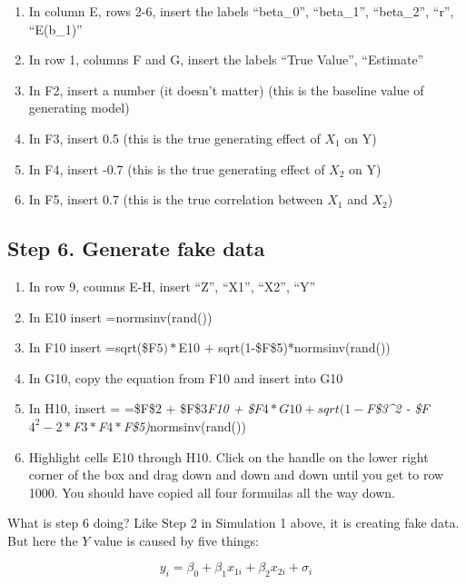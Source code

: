 \documentclass[]{book}
\providecommand{\tightlist}{%
  \setlength{\itemsep}{0pt}\setlength{\parskip}{0pt}}
\begin{document}
\begin{enumerate}
\def\labelenumi{\arabic{enumi}.}
\tightlist
\item
  In column E, rows 2-6, insert the labels ``beta\_0'', ``beta\_1'',
  ``beta\_2'', ``r'', ``E(b\_1)''
\item
  In row 1, columns F and G, insert the labels ``True Value'',
  ``Estimate''
\item
  In F2, insert a number (it doesn't matter) (this is the baseline value
  of generating model)
\item
  In F3, insert 0.5 (this is the true generating effect of \(X_1\) on Y)
\item
  In F4, insert -0.7 (this is the true generating effect of \(X_2\) on
  Y)
\item
  In F5, insert 0.7 (this is the true correlation between \(X_1\) and
  \(X_2\))
\end{enumerate}

\subsection{Step 6. Generate fake
data}\label{step-6.-generate-fake-data}

\begin{enumerate}
\def\labelenumi{\arabic{enumi}.}
\tightlist
\item
  In row 9, coumns E-H, insert ``Z'', ``X1'', ``X2'', ``Y''
\item
  In E10 insert =normsinv(rand())
\item
  In F10 insert =sqrt(\$F\(5)*\)E10 + sqrt(1-\$F\$5)*normsinv(rand())
\item
  In G10, copy the equation from F10 and insert into G10
\item
  In H10, insert = =\$F\$2 + \$F\$3\emph{F10 +
  \$F\(4*G10 + sqrt(1-\)F\$3\^{}2 -
  \$F\(4^2 - 2*\)F\(3*\)F\(4*\)F\$5)}normsinv(rand())
\item
  Highlight cells E10 through H10. Click on the handle on the lower
  right corner of the box and drag down and down and down until you get
  to row 1000. You should have copied all four formuilas all the way
  down.
\end{enumerate}

What is step 6 doing? Like Step 2 in Simulation 1 above, it is creating
fake data. But here the \(Y\) value is caused by five things:

\begin{equation}
y_i = \beta_0 + \beta_1 x_{1i} + \beta_2 x_{2i} + \sigma_i
\end{equation}
\end{document}

